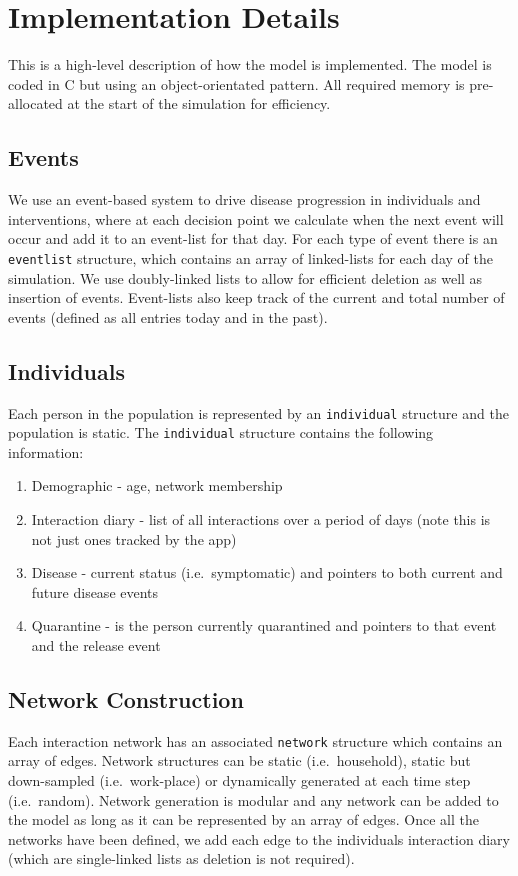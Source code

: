 \documentclass[11pt, oneside]{amsart}   	%
\begin{document}
\section{Implementation Details}
This is a high-level description of how the model is implemented.
The model is coded in C but using an object-orientated pattern.
All required memory is pre-allocated at the start of the simulation for efficiency.

\subsection{Events} 
We use an event-based system to drive disease progression in individuals and interventions, where at each decision point we calculate when the next event will occur and add it to an event-list for that day.
For each type of event there is an \texttt{eventlist} structure, which contains an array of linked-lists for each day of the simulation.
We use doubly-linked lists to allow for efficient deletion as well as insertion of events.
Event-lists also keep track of the current and total number of events (defined as all entries today and in the past). 

\subsection{Individuals} 
Each person in the population is represented by an \texttt{individual} structure and the population is static.
The \texttt{individual} structure contains the following information:
\begin{enumerate}
\item Demographic - age, network membership
\item Interaction diary - list of all interactions over a period of days (note this is not just ones tracked by the app)
\item Disease - current status (i.e.\ symptomatic) and pointers to both current and future disease events
\item Quarantine - is the person currently quarantined and pointers to that event and the release event
\end{enumerate}

\subsection{Network Construction}
Each interaction network has an associated \texttt{network} structure which contains an array of edges.
Network structures can be static (i.e.\ household), static but down-sampled (i.e.\ work-place) or dynamically generated at each time step (i.e.\ random).
Network generation is modular and any network can be added to the model as long as it can be represented by an array of edges.
Once all the networks have been defined, we add each edge to the individuals interaction diary (which are single-linked lists as deletion is not required).
\end{document}
